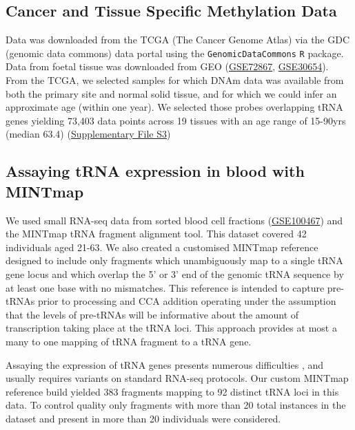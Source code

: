 \documentclass[]{book}
\begin{document}
\hypertarget{TCGAmethods}{%
\subsection{Cancer and Tissue Specific Methylation Data}\label{TCGAmethods}}

Data was downloaded from the TCGA (The Cancer Genome Atlas) via the GDC (genomic data commons) data portal \citep{Grossman2016} using the \texttt{GenomicDataCommons} \texttt{R} package.
Data from foetal tissue \citep{Yang2016, Nazor2012} was downloaded from GEO (\href{https://www.ncbi.nlm.nih.gov/geo/query/acc.cgi?acc=GSE72867}{GSE72867}, \href{https://www.ncbi.nlm.nih.gov/geo/query/acc.cgi?acc=GSE30654}{GSE30654}).
From the TCGA, we selected samples for which DNAm data was available from both the primary site and normal solid tissue, and for which we could infer an approximate age (within one year).
We selected those probes overlapping tRNA genes yielding 73,403 data points across 19 tissues with an age range of 15-90yrs (median 63.4) (\href{./Supplementary_Files/TCGA_samples_used.tsv}{Supplementary File S3})

\hypertarget{mintmapmethods}{%
\subsection{Assaying tRNA expression in blood with MINTmap}\label{mintmapmethods}}

We used small RNA-seq data from sorted blood cell fractions \citep{Juzenas2017} (\href{https://www.ncbi.nlm.nih.gov/geo/query/acc.cgi?acc=GSE100467}{GSE100467}) and the MINTmap \citep{Loher2017} tRNA fragment alignment tool.
This dataset covered 42 individuals aged 21-63.
We also created a customised MINTmap reference designed to include only fragments which unambiguously map to a single tRNA gene locus and which overlap the 5' or 3' end of the genomic tRNA sequence by at least one base with no mismatches.
This reference is intended to capture pre-tRNAs prior to processing and CCA addition operating under the assumption that the levels of pre-tRNAs will be informative about the amount of transcription taking place at the tRNA loci.
This approach provides at most a many to one mapping of tRNA fragment to a tRNA gene.

Assaying the expression of tRNA genes presents numerous difficulties \citep{Torres2019}, and usually requires variants on standard RNA-seq protocols.
Our custom MINTmap reference build yielded 383 fragments mapping to 92 distinct tRNA loci in this data.
To control quality only fragments with more than 20 total instances in the dataset and present in more than 20 individuals were considered.
\end{document}

